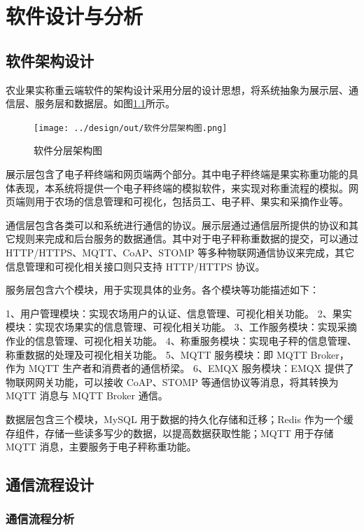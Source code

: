 \chapter{软件设计与分析}

\section{软件架构设计}

农业果实称重云端软件的架构设计采用分层的设计思想，将系统抽象为展示层、通信层、服务层和数据层。如图\ref{fig:软件分层架构图}所示。

\begin{figure}[H]
    \centering
    \texttt{[image: ../design/out/软件分层架构图.png]}
    \caption{软件分层架构图}
    \label{fig:软件分层架构图}
\end{figure}

展示层包含了电子秤终端和网页端两个部分。其中电子秤终端是果实称重功能的具体表现，本系统将提供一个电子秤终端的模拟软件，来实现对称重流程的模拟。网页端则用于农场的信息管理和可视化，包括员工、电子秤、果实和采摘作业等。

通信层包含各类可以和系统进行通信的协议。展示层通过通信层所提供的协议和其它规则来完成和后台服务的数据通信。其中对于电子秤称重数据的提交，可以通过 HTTP/HTTPS、MQTT、CoAP、STOMP 等多种物联网通信协议来完成，其它信息管理和可视化相关接口则只支持 HTTP/HTTPS 协议。

服务层包含六个模块，用于实现具体的业务。各个模块等功能描述如下：

1、用户管理模块：实现农场用户的认证、信息管理、可视化相关功能。
2、果实模块：实现农场果实的信息管理、可视化相关功能。
3、工作服务模块：实现采摘作业的信息管理、可视化相关功能。
4、称重服务模块：实现电子秤的信息管理、称重数据的处理及可视化相关功能。
5、MQTT 服务模块：即 MQTT Broker，作为 MQTT 生产者和消费者的通信桥梁。
6、EMQX 服务模块：EMQX 提供了物联网网关功能，可以接收 CoAP、STOMP 等通信协议等消息，将其转换为 MQTT 消息与 MQTT Broker 通信。

数据层包含三个模块，MySQL 用于数据的持久化存储和迁移；Redis 作为一个缓存组件，存储一些读多写少的数据，以提高数据获取性能；MQTT 用于存储 MQTT 消息，主要服务于电子秤称重功能。

\section{通信流程设计}

\subsection{通信流程分析}

